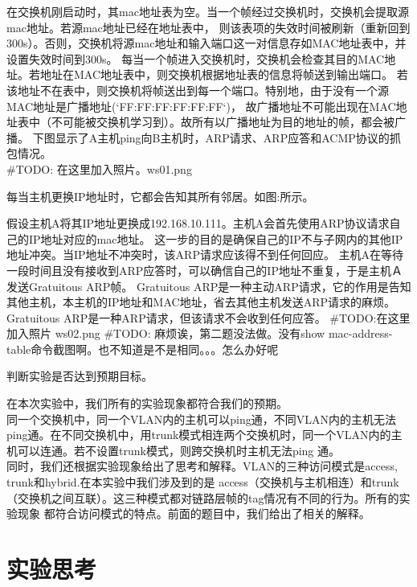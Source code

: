 \documentclass{myreport}
\begin{document}
在交换机刚启动时，其mac地址表为空。当一个帧经过交换机时，交换机会提取源mac地址。若源mac地址已经在地址表中，
则该表项的失效时间被刷新（重新回到300s）。否则，交换机将源mac地址和输入端口这一对信息存如MAC地址表中，并设置失效时间到300s。
每当一个帧进入交换机时，交换机会检查其目的MAC地址。若地址在MAC地址表中，则交换机根据地址表的信息将帧送到输出端口。
若该地址不在表中，则交换机将帧送出到每一个端口。特别地，由于没有一个源MAC地址是广播地址(`FF:FF:FF:FF:FF:FF`)，
故广播地址不可能出现在MAC地址表中（不可能被交换机学习到）。故所有以广播地址为目的地址的帧，都会被广播。
下图显示了A主机ping向B主机时，ARP请求、ARP应答和ACMP协议的抓包情况。\\ 
#TODO: 在这里加入照片。ws01.png

每当主机更换IP地址时，它都会告知其所有邻居。如图\TODO:所示。

假设主机A将其IP地址更换成192.168.10.111。主机A会首先使用ARP协议请求自己的IP地址对应的mac地址。
这一步的目的是确保自己的IP不与子网内的其他IP地址冲突。当IP地址不冲突时，该ARP请求应该得不到任何回应。
主机A在等待一段时间且没有接收到ARP应答时，可以确信自己的IP地址不重复，于是主机Ａ发送Gratuitous ARP帧。
Gratuitous ARP是一种主动ARP请求，它的作用是告知其他主机，本主机的IP地址和MAC地址，省去其他主机发送ARP请求的麻烦。
Gratuitous ARP是一种ARP请求，但该请求不会收到任何应答。
#TODO:在这里加入照片 ws02.png
#TODO: 麻烦诶，第二题没法做。没有show mac-address-table命令截图啊。也不知道是不是相同。。。怎么办好呢



\begin{tcolorbox}[title = {观察五}]
判断实验是否达到预期目标。
\end{tcolorbox}
在本次实验中，我们所有的实验现象都符合我们的预期。\\ 

同一个交换机中，同一个VLAN内的主机可以ping通，不同VLAN内的主机无法
ping通。在不同交换机中，用trunk模式相连两个交换机时，同一个VLAN内的主机可以连通。若不设置trunk模式，则跨交换机时主机无法ping
通。\\ 

同时，我们还根据实验现象给出了思考和解释。VLAN的三种访问模式是access, trunk和hybrid.在本实验中我们涉及到的是
access（交换机与主机相连）和trunk（交换机之间互联）。这三种模式都对链路层帧的tag情况有不同的行为。所有的实验现象
都符合访问模式的特点。前面的题目中，我们给出了相关的解释。
\section{实验思考}
\end{document}
